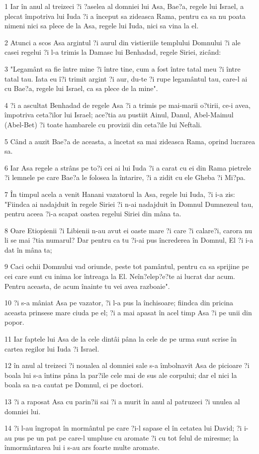 \par 1 Iar în anul al treizeci ?i ?aselea al domniei lui Asa, Bae?a, regele lui Israel, a plecat împotriva lui Iuda ?i a început sa zideasca Rama, pentru ca sa nu poata nimeni nici sa plece de la Asa, regele lui Iuda, nici sa vina la el.
\par 2 Atunci a scos Asa argintul ?i aurul din vistieriile templului Domnului ?i ale casei regelui ?i l-a trimis la Damasc lui Benhadad, regele Siriei, zicând:
\par 3 "Legamânt sa fie între mine ?i între tine, cum a fost între tatal meu ?i între tatal tau. Iata eu î?i trimit argint ?i aur, du-te ?i rupe legamântul tau, care-l ai cu Bae?a, regele lui Israel, ca sa plece de la mine".
\par 4 ?i a ascultat Benhadad de regele Asa ?i a trimis pe mai-marii o?tirii, ce-i avea, împotriva ceta?ilor lui Israel; ace?tia au pustiit Ainul, Danul, Abel-Maimul (Abel-Bet) ?i toate hambarele cu provizii din ceta?ile lui Neftali.
\par 5 Când a auzit Bae?a de aceasta, a încetat sa mai zideasca Rama, oprind lucrarea sa.
\par 6 Iar Asa regele a strâns pe to?i cei ai lui Iuda ?i a carat cu ei din Rama pietrele ?i lemnele pe care Bae?a le folosea la întarire, ?i a zidit cu ele Gheba ?i Mi?pa.
\par 7 În timpul acela a venit Hanani vazatorul la Asa, regele lui Iuda, ?i i-a zis: "Fiindca ai nadajduit în regele Siriei ?i n-ai nadajduit în Domnul Dumnezeul tau, pentru aceea ?i-a scapat oastea regelui Siriei din mâna ta.
\par 8 Oare Etiopienii ?i Libienii n-au avut ei oaste mare ?i care ?i calare?i, carora nu li se mai ?tia numarul? Dar pentru ca tu ?i-ai pus încrederea în Domnul, El ?i i-a dat în mâna ta;
\par 9 Caci ochii Domnului vad oriunde, peste tot pamântul, pentru ca sa sprijine pe cei care sunt cu inima lor întreaga la El. Neîn?elep?e?te ai lucrat dar acum. Pentru aceasta, de acum înainte tu vei avea razboaie".
\par 10 ?i s-a mâniat Asa pe vazator, ?i l-a pus la închisoare; fiindca din pricina aceasta prinsese mare ciuda pe el; ?i a mai apasat în acel timp Asa ?i pe unii din popor.
\par 11 Iar faptele lui Asa de la cele dintâi pâna la cele de pe urma sunt scrise în cartea regilor lui Iuda ?i Israel.
\par 12 în anul al treizeci ?i noualea al domniei sale s-a îmbolnavit Asa de picioare ?i boala lui s-a întins pâna la par?ile cele mai de sus ale corpului; dar el nici la boala sa n-a cautat pe Domnul, ci pe doctori.
\par 13 ?i a raposat Asa cu parin?ii sai ?i a murit în anul al patruzeci ?i unulea al domniei lui.
\par 14 ?i l-au îngropat în mormântul pe care ?i-l sapase el în cetatea lui David; ?i i-au pus pe un pat pe care-l umpluse cu aromate ?i cu tot felul de miresme; la înmormântarea lui i s-au ars foarte multe aromate.

